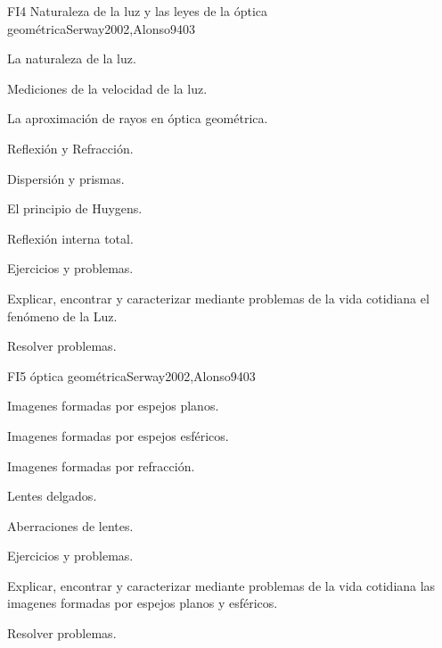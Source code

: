 \begin{syllabus}
\begin{unit}{FI4 Naturaleza de la luz y las leyes de la óptica geométrica}{Serway2002,Alonso94}{0}{3}
\begin{topics}
      \item La naturaleza de la luz.
        \item Mediciones de la velocidad de la luz.
        \item La aproximación de rayos en óptica geométrica.
        \item Reflexión y Refracción.
        \item Dispersión y prismas.
        \item El principio de Huygens.
        \item Reflexión interna total.
        \item Ejercicios y problemas.
   \end{topics}

   \begin{learningoutcomes}
      \item Explicar, encontrar y caracterizar mediante problemas de la vida cotidiana el fenómeno de la Luz.
      \item Resolver problemas.
      \end{learningoutcomes}
\end{unit}

\begin{unit}{FI5 óptica geométrica}{Serway2002,Alonso94}{0}{3}
\begin{topics}
      \item Imagenes formadas por espejos planos.
        \item Imagenes formadas por espejos esféricos.
        \item Imagenes formadas por refracción.
        \item Lentes delgados.
        \item Aberraciones de lentes.
        \item Ejercicios y problemas.
      \end{topics}

   \begin{learningoutcomes}
      \item Explicar, encontrar y caracterizar mediante problemas de la vida cotidiana las imagenes formadas por espejos planos y esféricos.
      \item Resolver problemas.
   \end{learningoutcomes}
\end{unit}


\end{syllabus}
